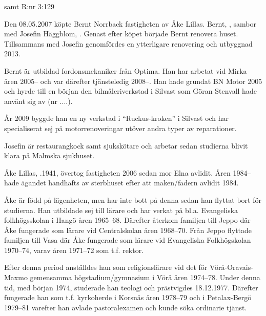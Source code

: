 %
 samt  R:nr 3:129



%

Den 08.05.2007 köpte Bernt Norrback fastigheten av Åke Lillas. Bernt, ,  sambor med Josefin Häggblom, . Genast efter köpet började Bernt renovera huset. Tillsammans med Josefin genomfördes en ytterligare renovering och utbyggnad 2013.

Bernt är utbildad fordonsmekaniker från Optima. Han har arbetat vid Mirka åren 2005-- och var därefter tjänsteledig 2008--. Han hade grundat BN Motor 2005 och hyrde till en början den bilmåleriverkstad i Silvast som Göran Stenvall hade använt sig av (nr ....).

År 2009 byggde han en ny verkstad i ``Ruckus-kroken'' i Silvast och har specialiserat sej på motorrenoveringar utöver andra typer av 	reparationer.

Josefin är restaurangkock samt sjukskötare och arbetar sedan studierna blivit klara på Malmska sjukhuset.
\begin{jhchildren}
  \item {}
  \item {}
\end{jhchildren}


%
Åke Lillas, .1941, övertog fastigheten 2006 sedan mor Elna avlidit. Åren 1984-- hade ägandet handhafts av sterbhuset efter	att maken/fadern avlidit 1984.

Åke är född på lägenheten, men har inte bott på denna sedan han	flyttat bort för studierna. Han utbildade sej till lärare och har verkat	på bl.a. Evangeliska folkhögsskolan i Hangö åren 1965--68. Därefter	återkom familjen till Jeppo där Åke fungerade som lärare vid Centralskolan åren 1968--70. Från Jeppo flyttade familjen till Vasa där Åke fungerade som lärare vid Evangeliska Folkhögskolan 1970--74, varav	åren 1971--72 som t.f. rektor.

Efter denna period anställdes han som religionslärare vid det för	Vörå-Oravais-Maxmo gemensamma högstadium/gymnasium i Vörå	åren 1974--78. Under denna tid, med början 1974, studerade han	teologi och prästvigdes 18.12.1977. Därefter fungerade han som t.f.	kyrkoherde i Korsnäs åren 1978--79 och i Petalax-Bergö 1979--81 varefter han avlade pastoralexamen och kunde söka ordinarie tjänst.

